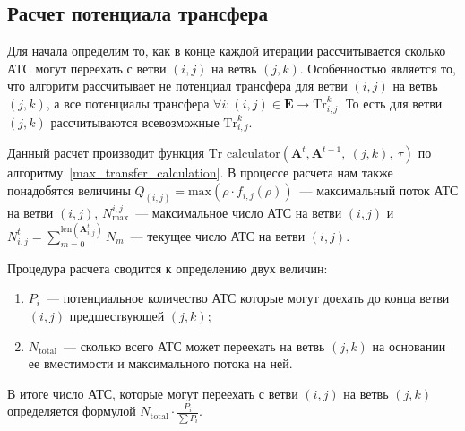 \subsection{Расчет потенциала трансфера}
Для начала определим то, как в конце каждой итерации рассчитывается сколько АТС могут переехать с ветви \((i,j)\) на ветвь \((j,k)\).
Особенностью является то, что алгоритм рассчитывает не потенциал трансфера для ветви \((i,j)\) на ветвь \((j,k)\), а все потенциалы трансфера \(\forall i: (i,j)\in \mathbf{E} \rightarrow \text{Tr}_{i, j}^k\).
То есть для ветви \((j,k)\) рассчитываются всевозможные \(\text{Tr}_{i, j}^k\).

Данный расчет производит функция \(\text{Tr\_calculator}(\mathbf{A}^t, \mathbf{A}^{t-1},\ (j,k),\ \tau)\) по алгоритму~\ref{max_transfer_calculation}.
В процессе расчета нам также понадобятся величины \(Q_(i,j) = \text{max}(\rho\cdot f_{i,j}(\rho))\)~--- максимальный поток АТС на ветви \((i,j)\),
\(N^{i,j}_\text{max}\)~--- максимальное число АТС на ветви \((i,j)\) и \(N^t_{i,j} = \sum_{m=0}^{\text{len}(\mathbf{A}^t_{i,j})} N_m\)~--- текущее число АТС на ветви \((i,j)\).

Процедура расчета сводится к определению двух величин:
\begin{enumerate}[label=\arabic*),ref=\arabic*]
  \item \(P_i\)~--- потенциальное количество АТС которые могут доехать до конца ветви \((i,j)\) предшествующей \((j,k)\);
  \item \(N_\text{total}\)~--- сколько всего АТС может переехать на ветвь \((j,k)\) на основании ее вместимости и максимального потока на ней.
\end{enumerate}
В итоге число АТС, которые могут переехать с ветви \((i,j)\) на ветвь \((j,k)\) определяется формулой \(N_\text{total} \cdot \frac{P_i}{\sum P_i}\).


